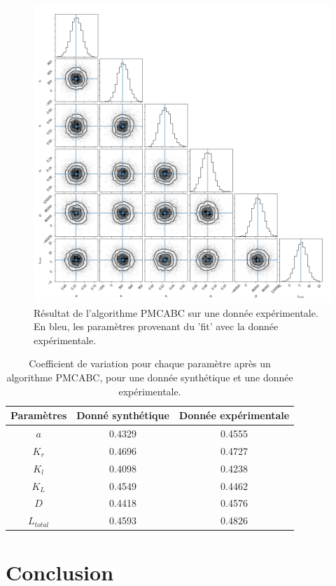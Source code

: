 \documentclass[a4paper,fleqn,leqno]{article}
\begin{document}
\begin{figure}[H]
\centering
\includegraphics[scale=0.5]{abcpmc_data}
\centering
\caption{Résultat de l'algorithme PMCABC sur une donnée expérimentale. En bleu, les paramètres provenant du 'fit' avec la donnée expérimentale.}
\label{figure:8}
\end{figure}

\begin{table}[H]
\centering
\begin{tabular}{|c|c|c|}
\hline
Paramètres   & Donné synthétique & Donnée expérimentale\\
\hline
$a$         & 0.4329 & 0.4555\\
$K_r$       & 0.4696 & 0.4727\\
$K_l$       & 0.4098 & 0.4238\\
$K_L$       & 0.4549 & 0.4462\\
$D$         & 0.4418 & 0.4576\\
$L_{total}$ & 0.4593 & 0.4826\\
\hline
\end{tabular}
\caption{Coefficient de variation pour chaque paramètre après un algorithme PMCABC, pour une donnée synthétique et une donnée expérimentale.} 
\label{table : 2}
\end{table}

\section{Conclusion}
\end{document}
